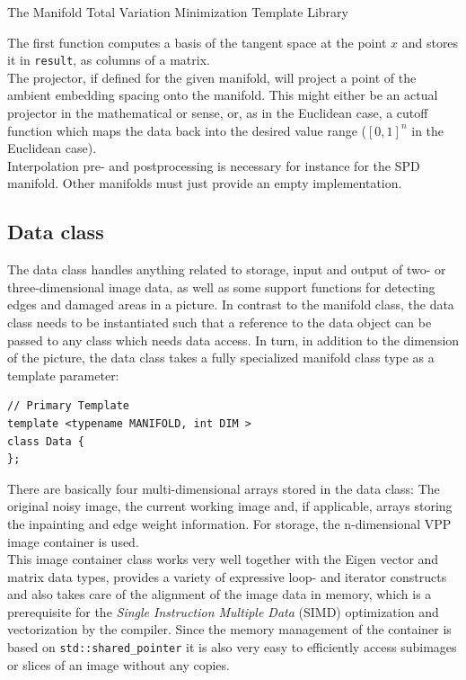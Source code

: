 \begin{chapter}{The Manifold Total Variation Minimization Template Library}
\begin{description}
	The first function computes a basis of the tangent space at the point $x$ and stores it in \texttt{result}, as columns of a matrix.\\
	The projector, if defined for the given manifold, will project a point of the ambient embedding spacing onto the manifold. This might either be an actual projector in the mathematical or sense, or, as in the Euclidean case, a cutoff
	function which maps the data back into the desired value range ($[0,1]^n$ in the Euclidean case). \\
	Interpolation pre- and postprocessing is necessary for instance for the SPD manifold. Other manifolds must just provide an empty implementation.
\end{description}
\subsection{Data class} %
\label{sub:Data class}
The data class handles anything related to storage, input and output of two- or three-dimensional image data, as well as some support functions for detecting edges and damaged areas in a picture.
In contrast to the manifold class, the data class needs to be instantiated such that a reference to the data object can be passed to any class which needs data access. In turn, in addition
to the dimension of the picture, the data class takes a fully specialized manifold class type as a template parameter:

\cppinline
\begin{lstlisting}
// Primary Template
template <typename MANIFOLD, int DIM >
class Data {
};    
\end{lstlisting}

There are basically four multi-dimensional arrays stored in the data class: The original noisy image, the current working image and, if applicable, arrays storing the inpainting
and edge weight information. For storage, the n-dimensional VPP \cite{VPP} image container is used.\\

This image container class works very well together with the Eigen vector and matrix data types, provides a variety of expressive loop- and iterator constructs and also takes care
of the alignment of the image data in memory, which is a prerequisite for the \textit{Single Instruction Multiple Data} (SIMD) optimization and vectorization by the compiler.
Since the memory management of the container is based on \texttt{std::shared\_pointer} it is also very easy to efficiently access subimages or slices of an image without any copies.\\


\end{chapter}
